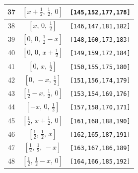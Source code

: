\documentclass[fleqn,8pt]{jsarticle}
\begin{document}
\begin{longtable}{ccc}
37 & $\left[ x + \frac{1}{2},\, \frac{1}{2},\, 0 \right]$ & {\tt [145,152,177,178]} \\ \hline
38 & $\left[ x,\, 0,\, \frac{1}{2} \right]$ & {\tt [146,147,181,182]} \\ \hline
39 & $\left[ 0,\, 0,\, \frac{1}{2} - x \right]$ & {\tt [148,160,173,183]} \\ \hline
40 & $\left[ 0,\, 0,\, x + \frac{1}{2} \right]$ & {\tt [149,159,172,184]} \\ \hline
41 & $\left[ 0,\, x,\, \frac{1}{2} \right]$ & {\tt [150,155,175,180]} \\ \hline
42 & $\left[ 0,\, - x,\, \frac{1}{2} \right]$ & {\tt [151,156,174,179]} \\ \hline
43 & $\left[ \frac{1}{2} - x,\, \frac{1}{2},\, 0 \right]$ & {\tt [153,154,169,176]} \\ \hline
44 & $\left[ - x,\, 0,\, \frac{1}{2} \right]$ & {\tt [157,158,170,171]} \\ \hline
45 & $\left[ \frac{1}{2},\, x + \frac{1}{2},\, 0 \right]$ & {\tt [161,168,188,190]} \\ \hline
46 & $\left[ \frac{1}{2},\, \frac{1}{2},\, x \right]$ & {\tt [162,165,187,191]} \\ \hline
47 & $\left[ \frac{1}{2},\, \frac{1}{2},\, - x \right]$ & {\tt [163,167,186,189]} \\ \hline
48 & $\left[ \frac{1}{2},\, \frac{1}{2} - x,\, 0 \right]$ & {\tt [164,166,185,192]} \\
\end{longtable}
\renewcommand{\arraystretch}{1.2}
\end{document}
